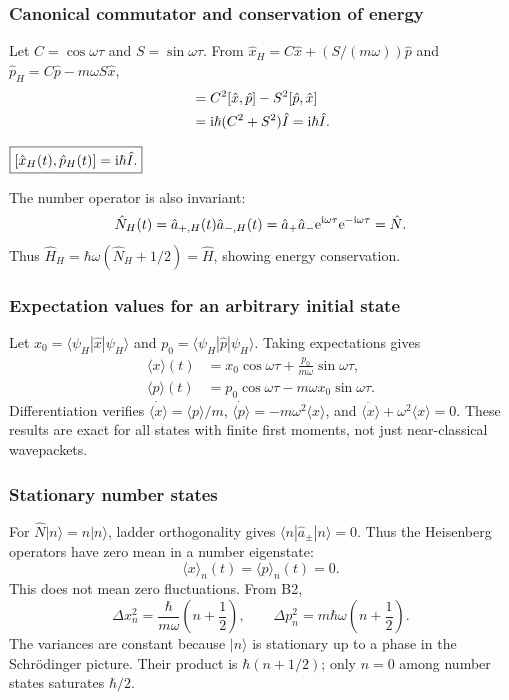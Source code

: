 \documentclass[11pt,a4paper]{article}
\newcommand{\key}[1]{\begin{resultbox}\centering\(\displaystyle #1\)\end{resultbox}}
\newcommand{\avg}[1]{\langle #1\rangle}\newcommand{\Sch}{Schr\"odinger}
\newcommand{\bra}[1]{\langle #1|}\newcommand{\ket}[1]{|#1\rangle}
\begin{document}
\subsubsection{Canonical commutator and conservation of energy}
Let \(C=\cos\omega\tau\) and \(S=\sin\omega\tau\). From \(\hat x_H=C\hat x+(S/(m\omega))\hat p\) and \(\hat p_H=C\hat p-m\omega S\hat x\),
\begin{align}
[\hat x_H,\hat p_H]
&=C^2[\hat x,\hat p]-S^2[\hat p,\hat x]\\
&=\iu\hbar(C^2+S^2)\hat I=\iu\hbar\hat I.
\end{align}
\key{\boxed{[\hat x_H(t),\hat p_H(t)]=\iu\hbar\hat I.}}
The number operator is also invariant:
\begin{equation}\hat N_H(t)=\hat a_{+,H}(t)\hat a_{-,H}(t)=\hat a_+\hat a_-\mathrm{e}^{\mathrm{i}\omega\tau}\mathrm{e}^{-\mathrm{i}\omega\tau}=\hat N.\end{equation}
Thus \(\hat H_H=\hbar\omega(\hat N_H+1/2)=\hat H\), showing energy conservation.

\subsubsection{Expectation values for an arbitrary initial state}
Let \(x_0=\bra{\psi_H}\hat x\ket{\psi_H}\) and \(p_0=\bra{\psi_H}\hat p\ket{\psi_H}\). Taking expectations gives
\begin{equation}
\boxed{\begin{aligned}
\avg x(t)&=x_0\cos\omega\tau+\frac{p_0}{m\omega}\sin\omega\tau,\\
\avg p(t)&=p_0\cos\omega\tau-m\omega x_0\sin\omega\tau.
\end{aligned}}
\end{equation}
Differentiation verifies \(\dot{\avg x}=\avg p/m\), \(\dot{\avg p}=-m\omega^2\avg x\), and \(\ddot{\avg x}+\omega^2\avg x=0\). These results are exact for all states with finite first moments, not just near-classical wavepackets.

\subsubsection{Stationary number states}
For \(\hat N\ket n=n\ket n\), ladder orthogonality gives \(\bra n\hat a_\pm\ket n=0\). Thus the Heisenberg operators have zero mean in a number eigenstate:
\begin{equation}\boxed{\avg x_n(t)=\avg p_n(t)=0.}\end{equation}
This does not mean zero fluctuations. From B2,
\begin{equation}\boxed{\Delta x_n^2=\frac{\hbar}{m\omega}\left(n+\frac12\right),\qquad\Delta p_n^2=m\hbar\omega\left(n+\frac12\right).}\end{equation}
The variances are constant because \(\ket n\) is stationary up to a phase in the Schr\"odinger picture. Their product is \(\hbar(n+1/2)\); only \(n=0\) among number states saturates \(\hbar/2\).
\end{document}
